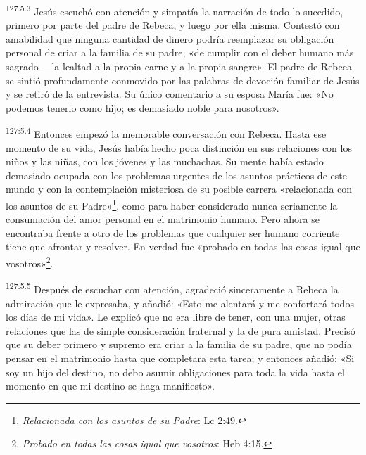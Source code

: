 \par
\textsuperscript{127:5.3} Jesús escuchó con atención y simpatía la narración de todo lo sucedido, primero por parte del padre de Rebeca, y luego por ella misma. Contestó con amabilidad que ninguna cantidad de dinero podría reemplazar su obligación personal de criar a la familia de su padre, «de cumplir con el deber humano más sagrado ---la lealtad a la propia carne y a la propia sangre». El padre de Rebeca se sintió profundamente conmovido por las palabras de devoción familiar de Jesús y se retiró de la entrevista. Su único comentario a su esposa María fue: «No podemos tenerlo como hijo; es demasiado noble para nosotros».

\par
\textsuperscript{127:5.4} Entonces empezó la memorable conversación con Rebeca. Hasta ese momento de su vida, Jesús había hecho poca distinción en sus relaciones con los niños y las niñas, con los jóvenes y las muchachas. Su mente había estado demasiado ocupada con los problemas urgentes de los asuntos prácticos de este mundo y con la contemplación misteriosa de su posible carrera «relacionada con los asuntos de su Padre»\footnote{\textit{Relacionada con los asuntos de su Padre}: Lc 2:49.}, como para haber considerado nunca seriamente la consumación del amor personal en el matrimonio humano. Pero ahora se encontraba frente a otro de los problemas que cualquier ser humano corriente tiene que afrontar y resolver. En verdad fue «probado en todas las cosas igual que vosotros»\footnote{\textit{Probado en todas las cosas igual que vosotros}: Heb 4:15.}.

\par
\textsuperscript{127:5.5} Después de escuchar con atención, agradeció sinceramente a Rebeca la admiración que le expresaba, y añadió: «Esto me alentará y me confortará todos los días de mi vida». Le explicó que no era libre de tener, con una mujer, otras relaciones que las de simple consideración fraternal y la de pura amistad. Precisó que su deber primero y supremo era criar a la familia de su padre, que no podía pensar en el matrimonio hasta que completara esta tarea; y entonces añadió: «Si soy un hijo del destino, no debo asumir obligaciones para toda la vida hasta el momento en que mi destino se haga manifiesto».

